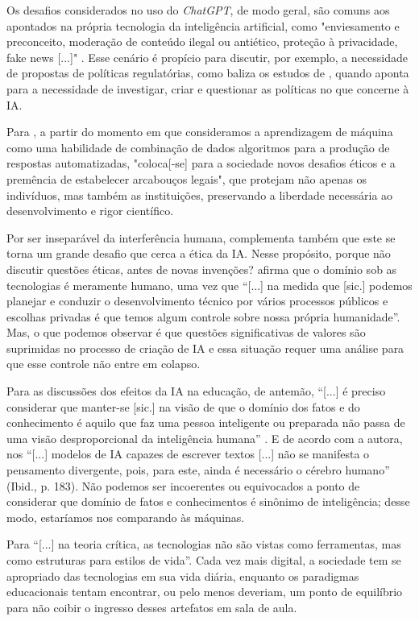 \documentclass[portuguese]{textolivre}
\begin{document}
Os desafios considerados no uso do \emph{ChatGPT}, de modo geral, são comuns aos apontados na própria tecnologia da inteligência artificial, como "enviesamento e preconceito, moderação de conteúdo ilegal ou antiético, proteção à privacidade, fake news [...]" \cite[p. 191]{2022kaufman}. Esse cenário é propício para discutir, por exemplo, a necessidade de propostas de políticas regulatórias, como baliza os estudos de \textcite{coeckelbergh2020ai}, quando aponta para a necessidade de investigar, criar e questionar as políticas no que concerne à IA.

Para \textcite[p. 83]{2022kaufman}, a partir do momento em que consideramos a aprendizagem de máquina como uma habilidade de combinação de dados algoritmos para a produção de respostas automatizadas, "coloca[-se] para a sociedade novos desafios éticos e a premência de estabelecer arcabouços legais", que protejam não apenas os indivíduos, mas também as instituições, preservando a liberdade necessária ao desenvolvimento e rigor científico.

Por ser inseparável da interferência humana, \textcite{santaella2023inteligencia} complementa também que este se torna um grande desafio que cerca a ética da IA. Nesse propósito, porque não discutir questões éticas, antes de novas invenções? \textcite[p. 2]{feenberg2004} afirma que o domínio sob as tecnologias é meramente humano, uma vez que “[...] na medida que [sic.] podemos planejar e conduzir o desenvolvimento técnico por vários processos públicos e escolhas privadas é que temos algum controle sobre nossa própria humanidade”. Mas, o que podemos observar é que questões significativas de valores são suprimidas no processo de criação de IA e essa situação requer uma análise para que esse controle não entre em colapso. 

Para as discussões dos efeitos da IA na educação, de antemão, “[...] é preciso considerar que manter-se [sic.] na visão de que o domínio dos fatos e do conhecimento é aquilo que faz uma pessoa inteligente ou preparada não passa de uma visão desproporcional da inteligência humana” \cite[p. 183]{santaella2023inteligencia}. E de acordo com a autora, nos “[...] modelos de IA capazes de escrever textos [...] não se manifesta o pensamento divergente, pois, para este, ainda é necessário o cérebro humano” (Ibid., p. 183). Não podemos ser incoerentes ou equivocados a ponto de considerar que domínio de fatos e conhecimentos é sinônimo de inteligência; desse modo, estaríamos nos comparando às máquinas.

Para \textcite[p. 10]{feenberg2003} “[...] na teoria crítica, as tecnologias não são vistas como ferramentas, mas como estruturas para estilos de vida”. Cada vez mais digital, a sociedade tem se apropriado das tecnologias em sua vida diária, enquanto os paradigmas educacionais tentam encontrar, ou pelo menos deveriam, um ponto de equilíbrio para não coibir o ingresso desses artefatos em sala de aula.
\end{document}
